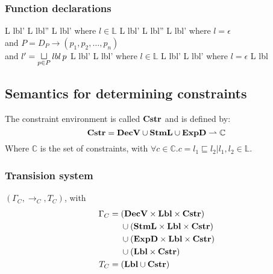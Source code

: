\subsubsection{Function declarations}

\begin{trules}
        { {L} {lbl'} }
        { {L} {lbl''} \;\;  {L} {lbl'} }
        {where $l \in \mathbb{L}$}
        { {L} {lbl'} }
        { {L} {lbl''} \;  {L} {lbl'} }
        {where $l = \epsilon$\\
        and $P = D_P \rightarrow (p_1, p_2, \dots, p_n)$\\
        and $l' = \sqcupl\limits_{p \in P} lbl \, p$}
        { {L} {lbl'} }
        { {L} {lbl'} }
        {where $l \in \mathbb{L}$}
        { {L} {lbl'} }
        { {L} {lbl'} }
        {where $l = \epsilon$}
        { {L} {lbl} }
        {}
        {}
\end{trules}

\subsection{Semantics for determining constraints}
The constraint environment is called $\mathbf{Cstr}$ and is defined by:
\[
  \mathbf{Cstr} = \mathbf{DecV} \cup \mathbf{StmL} \cup \mathbf{ExpD} \rightharpoonup \mathbb{C}
\]
Where $\mathbb{C}$ is the set of constraints, with $\forall c \in \mathbb{C} . c = l_1 \sqsubseteq l_2 | l_1, l_2 \in \mathbb{L}$.

\subsubsection{Transision system}
$(\Gamma_{C}, \rightarrow_{C}, T_{C})$, with
\begin{align*}
  \Gamma_{C} =  & \;        (\mathbf{DecV} \times \mathbf{Lbl} \times \mathbf{Cstr}) \\
                & \;  \cup  (\mathbf{StmL} \times \mathbf{Lbl} \times \mathbf{Cstr}) \\
                & \;  \cup  (\mathbf{ExpD} \times \mathbf{Lbl} \times \mathbf{Cstr}) \\
                & \;  \cup  (\mathbf{Lbl} \times \mathbf{Cstr})               \\
  T_{C} =       & \;  (\mathbf{Lbl} \cup \mathbf{Cstr})
\end{align*}


